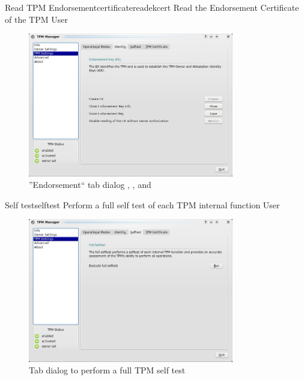\documentclass[
  american        %
]{sirrixreport}
\begin{document}
\begin{usecase}{Read TPM Endorsementcertificate}{readekcert}
\ucdesc Read the Endorsement Certificate of the TPM
\ucactors  User
\end{usecase}

\begin{figure}[h]
 \centering
 \includegraphics[width=0.8\textwidth]{images/uc_identity.jpg}
 \caption{''Endorsement`` tab dialog , ,  and }
\end{figure}
\clearpage

\begin{usecase}{Self test}{selftest}
\ucdesc Perform a full self test of each TPM internal function
\ucactors  User
\end{usecase}

\begin{figure}[h]
 \centering
 \includegraphics[width=0.8\textwidth]{images/uc_selftest.jpg}
 \caption{Tab dialog to perform a full TPM self test }
\end{figure}
\clearpage
\end{document}
